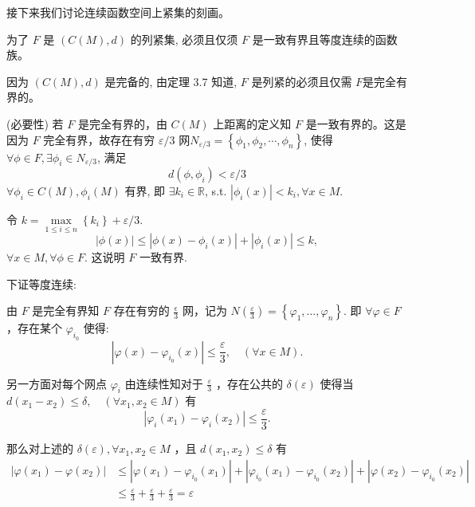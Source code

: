 接下来我们讨论连续函数空间上紧集的刻画。
\begin{theorem}
    为了 $F$ 是 $(C(M), d)$ 的列紧集, 必须且仅须 $F$ 是一致有界且等度连续的函数族。
\end{theorem}
\begin{solution}
    因为 $(C(M), d)$ 是完备的, 由定理 3.7 知道, $F$ 是列紧的必须且仅需 $F$是完全有界的。
    
    (必要性) 若 $F$ 是完全有界的，由 $C(M)$ 上距离的定义知 $F$ 是一致有界的。这是因为 $F$ 完全有界，故存在有穷 $\varepsilon / 3$ 网$N_{\varepsilon / 3}=\left\{\phi_1, \phi_2, \cdots, \phi_n\right\}$, 使得 $\forall \phi \in F, \exists \phi_i \in N_{\varepsilon / 3}$, 满足
    $$
        d\left(\phi, \phi_i\right)<\varepsilon / 3 
    $$
    $\forall \phi_i \in C(M), \phi_i(M)$ 有界, 即 $\exists k_i \in \mathbb{R}$, s.t. $\left|\phi_i(x)\right|<k_i, \forall x \in M$.

    令 $k=\max\limits_{1 \leq i \leq n}\left\{k_i\right\}+\varepsilon / 3$.
    $$
        |\phi(x)| \leq\left|\phi(x)-\phi_i(x)\right|+\left|\phi_i(x)\right| \leq k,
    $$
    $\forall x \in M, \forall \phi \in F$. 这说明 $F$ 一致有界.

    下证等度连续:

    由 $F$ 是完全有界知 $F$ 存在有穷的 $\frac{\epsilon}{3}$ 网，记为 $N\left(\frac{\varepsilon}{3}\right)=\left\{\varphi_1, \ldots, \varphi_n\right\}$. 即 $\forall \varphi \in F$ ，存在某个 $\varphi_{i_0}$ 使得:
    $$
        \left|\varphi(x)-\varphi_{i_0}(x)\right| \leq \frac{\varepsilon}{3}, \quad(\forall x \in M) .
    $$

    另一方面对每个网点 $\varphi_i$ 由连续性知对于 $\frac{\varepsilon}{3}$ ，存在公共的 $\delta(\varepsilon)$ 使得当 $d\left(x_1-x_2\right) \leq \delta, \quad\left(\forall x_1, x_2 \in M\right)$ 有
    $$
        \left|\varphi_i\left(x_1\right)-\varphi_i\left(x_2\right)\right| \leq \frac{\varepsilon}{3} .
    $$

    那么对上述的 $\delta(\varepsilon), \forall x_1, x_2 \in M$ ，且 $d\left(x_1, x_2\right) \leq \delta$ 有
    \begin{align*}
        \left|\varphi\left(x_1\right)-\varphi\left(x_2\right)\right| & \leq\left|\varphi\left(x_1\right)-\varphi_{i_0}\left(x_1\right)\right|+\left|\varphi_{i_0}\left(x_1\right)-\varphi_{i_0}\left(x_2\right)\right|+\left|\varphi\left(x_2\right)-\varphi_{i_0}\left(x_2\right)\right| \\
        & \leq \frac{\varepsilon}{3}+\frac{\varepsilon}{3}+\frac{\varepsilon}{3}=\varepsilon
    \end{align*}


\end{solution}
